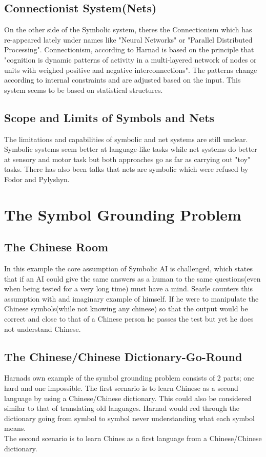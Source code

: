 \documentclass{article}
\begin{document}
	\subsection{Connectionist System(Nets)}
	On the other side of the Symbolic system, theres the Connectionism which has re-appeared lately under names like "Neural Networks" or "Parallel Distributed Processing". Connectionism, according to Harnad is based on the principle that "cognition is dynamic patterns of activity in a multi-layered network of nodes or units with weighed positive and negative interconnections". The patterns change according to internal constraints and are adjusted based on the input. This system seems to be based on statistical structures.
	\subsection{Scope and Limits of Symbols and Nets}
	The limitations and capabilities of symbolic and net systems are still unclear. Symbolic systems seem better at language-like tasks while net systems do better at sensory and motor task but both approaches go as far as carrying out "toy" tasks. There has also been talks that nets are symbolic which were refused by Fodor and Pylyshyn.
	\section{The Symbol Grounding Problem}
	\subsection{The Chinese Room}
	In this example the core assumption of Symbolic AI is challenged, which states that if an AI could give the same answers as a human to the same questions(even when being tested for a very long time) must have a mind.
	Searle counters this assumption with and imaginary example of himself. If he were to manipulate the Chinese symbols(while not knowing any chinese) so that the output would be correct and close to that of a Chinese person he passes the test but yet he does not understand Chinese.
	\subsection{The Chinese/Chinese Dictionary-Go-Round}
	Harnads own example of the symbol grounding problem consists of 2 parts; one hard and one impossible. The first scenario is to learn Chinese as a second language by using a Chinese/Chinese dictionary. This could also be considered similar to that of translating old languages. Harnad would red through the dictionary going from symbol to symbol never understanding what each symbol means.\\
	The second scenario is to learn Chines as a first language from a Chinese/Chinese dictionary.
\end{document}
